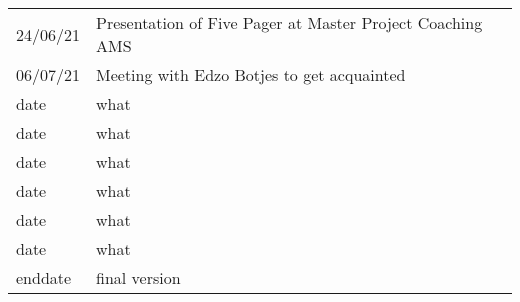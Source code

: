 \begin{table}[!h]
\begin{center}
\begin{tabularx}{\textwidth}{@{}lX@{}}
			24/06/21 & Presentation of Five Pager at Master Project Coaching AMS \\%
			06/07/21 & Meeting with Edzo Botjes to get acquainted \\%
			date    & what \\%
			date    & what \\%
			date    & what \\%
			date    & what \\%
			date    & what \\%
			date    & what \\%
			enddate    & final version \\ \bottomrule
		\end{tabularx}
		\label{tab:researchlog}
	\end{center}
\end{table}